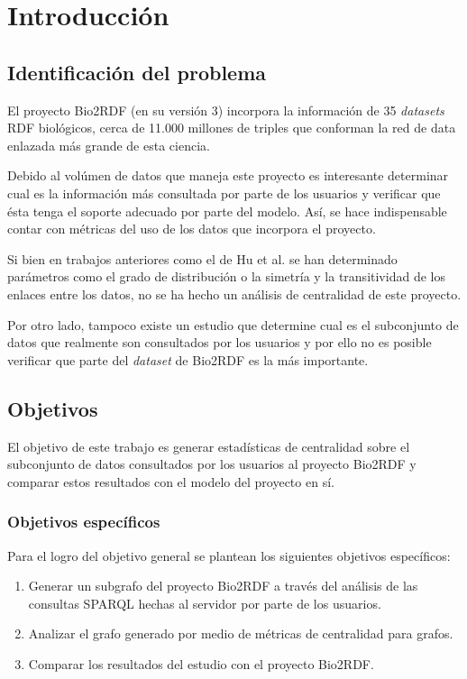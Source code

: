 
\chapter{Introducción}

\section{Identificación del problema}
El proyecto Bio2RDF (en su versión 3) incorpora la información de 35
\emph{datasets} RDF biológicos, cerca de 11.000 millones de triples que
conforman la red de data enlazada más grande de esta ciencia.

Debido al volúmen de datos que maneja este proyecto es interesante determinar
cual es la información más consultada por parte de los usuarios y verificar que
ésta tenga el soporte adecuado por parte del modelo. Así, se hace indispensable
contar con métricas del uso de los datos que incorpora el proyecto. 

Si bien en trabajos anteriores como el de Hu et al.\cite{hu2015link} se han
determinado parámetros como el grado de distribución o la simetría y la
transitividad de los enlaces entre los datos, no se ha hecho un análisis de
centralidad de este proyecto.

Por otro lado, tampoco existe un estudio que determine cual es el subconjunto de
datos que realmente son consultados por los usuarios y por ello no es posible
verificar que parte del \emph{dataset} de Bio2RDF es la más importante.

\section{Objetivos}

El objetivo de este trabajo es generar estadísticas de centralidad sobre el
subconjunto de datos consultados por los usuarios al proyecto Bio2RDF y comparar
estos resultados con el modelo del proyecto en sí.

\subsection{Objetivos específicos}
Para el logro del objetivo general se plantean los siguientes objetivos
específicos:
\begin{enumerate}
  \item
    Generar un subgrafo del proyecto Bio2RDF a través del análisis de las
    consultas SPARQL hechas al servidor por parte de los usuarios.
  \item
    Analizar el grafo generado por medio de métricas de centralidad para grafos.
  \item
    Comparar los resultados del estudio con el proyecto Bio2RDF.
\end{enumerate}
